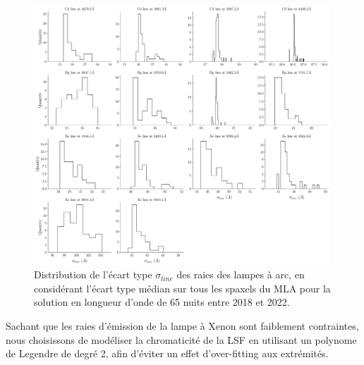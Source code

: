 \documentclass[../main/main.tex]{subfiles}
\begin{document}
\begin{figure}[ht]
  \centering
  \includegraphics[width=0.99\textwidth]{../figures/06_irf/linestd.pdf}
  \caption[Distribution de l'écart type $\sigma_{line}$ des raies des
  lampes à arc]{Distribution de l'écart type $\sigma_{line}$ des raies
    des lampes à arc, en
    considérant l'écart type médian sur tous les spaxels du MLA pour la
    solution en longueur d'onde de 65 nuits entre 2018 et 2022.}
  \label{fig:linestd}
\end{figure}

Sachant que les raies d'émission de la lampe à Xenon sont faiblement
contraintes, nous choisissons de modéliser la chromaticité de la LSF en
utilisant un polynome de Legendre de degré 2, afin d'éviter un effet
d'over-fitting aux extrémités.
\end{document}
